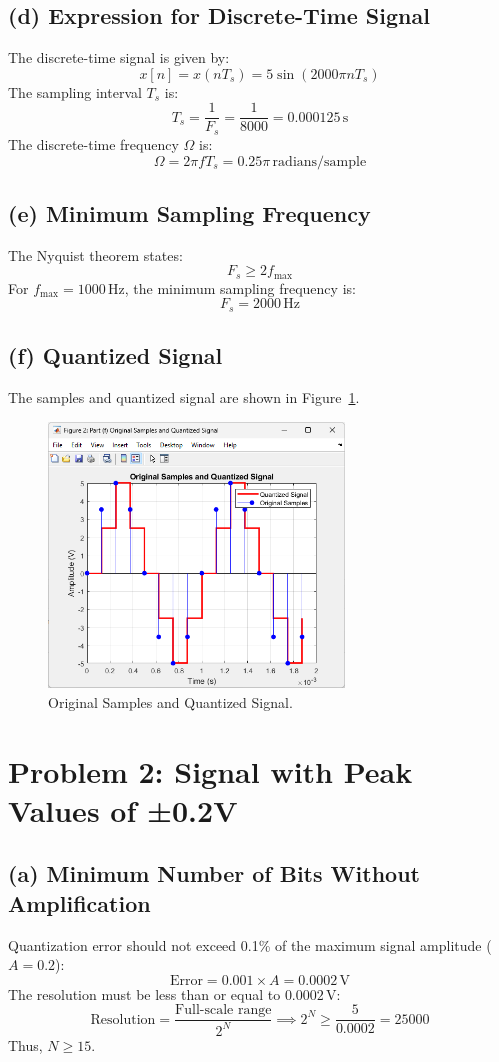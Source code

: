 \documentclass[12pt]{article}
\begin{document}
\subsection*{(d) Expression for Discrete-Time Signal}
The discrete-time signal is given by:
\[
x[n] = x(nT_s) = 5 \sin(2000\pi nT_s)
\]
The sampling interval \(T_s\) is:
\[
T_s = \frac{1}{F_s} = \frac{1}{8000} = 0.000125 \, \text{s}
\]
The discrete-time frequency \(\Omega\) is:
\[
\Omega = 2\pi f T_s = 0.25\pi \, \text{radians/sample}
\]

\subsection*{(e) Minimum Sampling Frequency}
The Nyquist theorem states:
\[
F_s \geq 2f_{\text{max}}
\]
For \(f_{\text{max}} = 1000 \, \text{Hz}\), the minimum sampling frequency is:
\[
F_s = 2000 \, \text{Hz}
\]

\subsection*{(f) Quantized Signal}
The samples and quantized signal are shown in Figure~\ref{fig:quantized_signal}.
\begin{figure}[H]
    \centering
    \includegraphics[width=0.7\textwidth]{F_Sketch.png}
    \caption{Original Samples and Quantized Signal.}
    \label{fig:quantized_signal}
\end{figure}

\section{Problem 2: Signal with Peak Values of ±0.2V}
\subsection*{(a) Minimum Number of Bits Without Amplification}
Quantization error should not exceed 0.1\% of the maximum signal amplitude (\(A = 0.2\)):
\[
\text{Error} = 0.001 \times A = 0.0002 \, \text{V}
\]
The resolution must be less than or equal to \(0.0002 \, \text{V}\):
\[
\text{Resolution} = \frac{\text{Full-scale range}}{2^N} \implies 2^N \geq \frac{5}{0.0002} = 25000
\]
Thus, \(N \geq 15\).
\end{document}
